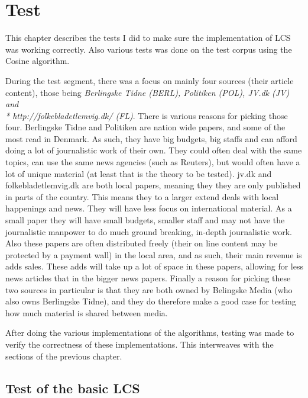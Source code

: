 \chapter{Test}

This chapter describes the tests I did to make sure the implementation of LCS was working correctly. Also various tests was done on the test corpus using the Cosine algorithm. 

During the test segment, there was a focus on mainly four sources (their article content), those being \textit{Berlingske Tidne (BERL), Politiken (POL), JV.dk (JV) and \\* http://folkebladetlemvig.dk/ (FL)}. There is various reasons for picking those four. Berlingske Tidne and Politiken are nation wide papers, and some of the most read in Denmark. As such, they have big budgets, big staffs and can afford doing a lot of journalistic work of their own. They could often deal with the same topics, can use the same news agencies (such as Reuters), but would often have a lot of unique material (at least that is the theory to be tested). jv.dk and folkebladetlemvig.dk are both local papers, meaning they they are only published in parts of the country. This means they to a larger extend deals with local happenings and news. They will have less focus on international material. As a small paper they will have small budgets, smaller staff and may not have the journalistic manpower to do much ground breaking, in-depth journalistic work. Also these papers are often distributed freely (their on line content may be protected by a payment wall) in the local area, and as such, their main revenue is adds sales. These adds will take up a lot of space in these papers, allowing for less news articles that in the bigger news papers. Finally a reason for picking these two sources in particular is that they are both owned by Belingske Media (who also owns Berlingske Tidne), and they do therefore make a good case for testing how much material is shared between media.

After doing the various implementations of the algorithms, testing was made to verify the correctness of these implementations. This interweaves with the sections of the previous chapter.

\section{Test of the basic LCS}

